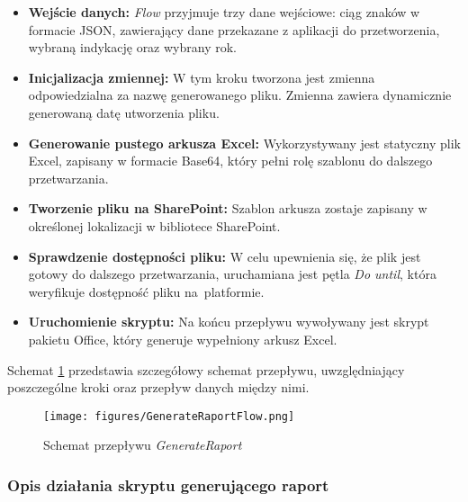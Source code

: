 \begin{itemize}
    \item \textbf{Wejście danych:} \emph{Flow} przyjmuje trzy dane wejściowe: ciąg znaków w formacie JSON, zawierający dane przekazane z aplikacji do przetworzenia, wybraną indykację oraz wybrany rok.
    \item \textbf{Inicjalizacja zmiennej:} W tym kroku tworzona jest zmienna odpowiedzialna za nazwę generowanego pliku. Zmienna zawiera dynamicznie generowaną datę utworzenia pliku.
    \item \textbf{Generowanie pustego arkusza Excel:} Wykorzystywany jest statyczny plik Excel, zapisany w formacie Base64, który pełni rolę szablonu do dalszego przetwarzania.
    \item \textbf{Tworzenie pliku na SharePoint:} Szablon arkusza zostaje zapisany w określonej lokalizacji w bibliotece SharePoint.
    \item \textbf{Sprawdzenie dostępności pliku:} W celu upewnienia się, że plik jest gotowy do dalszego przetwarzania, uruchamiana jest pętla \emph{Do until}, która weryfikuje dostępność pliku na~platformie.
    \item \textbf{Uruchomienie skryptu:} Na końcu przepływu wywoływany jest skrypt pakietu Office, który generuje wypełniony arkusz Excel.
\end{itemize}

Schemat \ref{fig:generateflowcomponent} przedstawia szczegółowy schemat przepływu, uwzględniający poszczególne kroki oraz przepływ danych między nimi.

\begin{figure}[H]
    \centering
    \texttt{[image: figures/GenerateRaportFlow.png]}
    \caption{Schemat przepływu \emph{GenerateRaport}}
    \label{fig:generateflowcomponent}
\end{figure}

\subsubsection*{Opis działania skryptu generującego raport}

